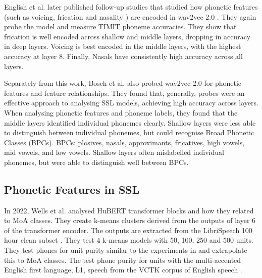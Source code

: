 English et al. \cite{english2023discovering} later published follow-up studies that studied how phonetic features (such as voicing, frication and nasality \cite{ipahandbook_1999}) are encoded in wav2vec 2.0 \cite{wav2vec}. They again probe the model and measure TIMIT phoneme accuracies. They show that frication is well encoded across shallow and middle layers, dropping in accuracy in deep layers. Voicing is best encoded in the middle layers, with the highest accuracy at layer 8. Finally, Nasals have consistently high accuracy across all layers.

Separately from this work, Bosch et al. \cite{ten2023phonemic} also probed wav2vec 2.0 for phonetic features and feature relationships. They found that, generally, probes were an effective approach to analysing SSL models, achieving high accuracy across layers. When analysing phonetic features and phoneme labels, they found that the middle layers identified individual phonemes clearly. Shallow layers were less able to distinguish between individual phonemes, but could recognise Broad Phonetic Classes (BPCs). BPCs: plosives, nasals, approximants, fricatives, high vowels, mid vowels, and low vowels. Shallow layers often mislabelled individual phonemes, but were able to distinguish well between BPCs.


\subsection{Phonetic Features in SSL}
In 2022, Wells et al. \cite{wells2022phonetic} analysed HuBERT transformer blocks and how they related to MoA classes. They create k-means clusters derived from the outputs of layer 6 of the transformer encoder. The outputs are extracted from the LibriSpeech 100 hour clean subset \cite{librispeech}. They test 4 k-means models with 50, 100, 250 and 500 units. They test phones for unit purity similar to the experiments in \cite{hsu2021hubert} and extrapolate this to MoA classes. The test phone purity for units with the multi-accented English first language, L1, speech from the VCTK corpus of English speech \cite{yamagishi2019cstr}.


